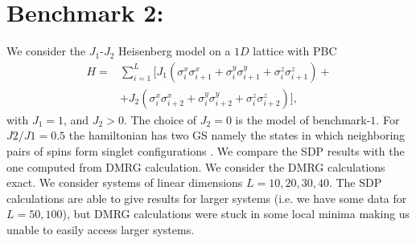 \documentclass[10pt,a4paper,twoside,twocolumn]{revtex4-1}
\begin{document}
 \section{Benchmark 2:}
We consider the $J_1$-$J_2$ Heisenberg model on a $1D$ lattice with PBC
\begin{align}
 H  = & \sum_{i=1}^L \big[ J_1 \left( \sigma_i^x \sigma_{i+1}^x+\sigma_i^y \sigma_{i+1}^y+\sigma_i^z \sigma_{i+1}^z \right)+\\
& + J_2 \left( \sigma_i^x \sigma_{i+2}^x+\sigma_i^y \sigma_{i+2}^y+\sigma_i^z \sigma_{i+2}^z \right)  \big],
 \end{align}
 with $J_1=1$, and $J_2>0$. The choice of $J_2=0$ is the model of benchmark-$1$.
 For $J2/J1 = 0.5$ the hamiltonian has two GS namely the states in which neighboring pairs of spins form singlet configurations \cite{majumdar1969,white1996}.
 We compare the SDP results with the one computed from DMRG calculation. We consider the DMRG calculations exact.
We consider systems of linear dimensions $L=10,20,30,40$. The SDP calculations are able to give results for larger systems (i.e. we have some data for $L=50,100$), but DMRG calculations were stuck in some local minima making us unable to easily access larger systems.
\end{document}
